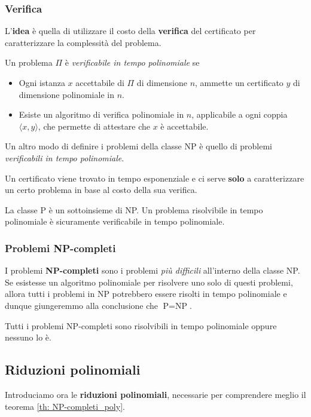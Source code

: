 \subsubsection{Verifica}
L'\textbf{idea} \`e quella di utilizzare il costo della \textbf{verifica} del certificato per caratterizzare la
complessit\`a del problema.

Un problema $\Pi$ \`e \emph{verificabile in tempo polinomiale} se
\begin{itemize}
	\item Ogni istanza $x$ accettabile di $\Pi$ di dimensione $n$, ammette un certificato $y$ di dimensione
	      polinomiale in $n$.
	\item Esiste un algoritmo di verifica polinomiale in $n$, applicabile a ogni coppia $\langle x, y \rangle$, che
	      permette di attestare che $x$ \`e accettabile.
\end{itemize}
Un altro modo di definire i problemi della classe NP \`e quello di problemi \emph{verificabili in tempo polinomiale}.

\begin{observation}
	Un certificato viene trovato in tempo esponenziale e ci serve \textbf{solo} a caratterizzare un certo problema in
	base al costo della sua verifica.
\end{observation}

\begin{theorem}
	La classe P \`e un sottoinsieme di NP. Un problema risolvibile in tempo polinomiale \`e sicuramente verificabile in
	tempo polinomiale.
\end{theorem}

\subsubsection{Problemi NP-completi}
I problemi \textbf{NP-completi} sono i problemi \emph{pi\`u difficili} all'interno della classe NP. Se esistesse un
algoritmo polinomiale per risolvere uno solo di questi problemi, allora tutti i problemi in NP potrebbero essere risolti
in tempo polinomiale e dunque giungeremmo alla conclusione che $\text{P} = \text{NP}$.

\begin{theorem}\label{th: NP-completi_poly}
	Tutti i problemi NP-completi sono risolvibili in tempo polinomiale oppure nessuno lo \`e.
\end{theorem}

\subsection{Riduzioni polinomiali}
Introduciamo ora le \textbf{riduzioni polinomiali}, necessarie per comprendere meglio il teorema
\ref{th: NP-completi_poly}.

